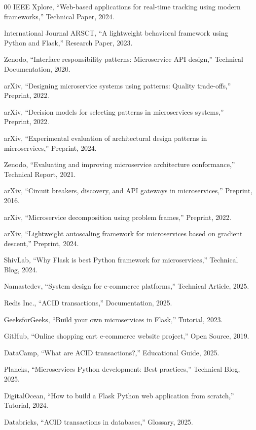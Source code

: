 \documentclass[conference]{IEEEtran}
\begin{document}
\begin{thebibliography}{00}
 IEEE Xplore, ``Web-based applications for real-time tracking using modern frameworks,'' Technical Paper, 2024.

 International Journal ARSCT, ``A lightweight behavioral framework using Python and Flask,'' Research Paper, 2023.

 Zenodo, ``Interface responsibility patterns: Microservice API design,'' Technical Documentation, 2020.

 arXiv, ``Designing microservice systems using patterns: Quality trade-offs,'' Preprint, 2022.

 arXiv, ``Decision models for selecting patterns in microservices systems,'' Preprint, 2022.

 arXiv, ``Experimental evaluation of architectural design patterns in microservices,'' Preprint, 2024.

 Zenodo, ``Evaluating and improving microservice architecture conformance,'' Technical Report, 2021.

 arXiv, ``Circuit breakers, discovery, and API gateways in microservices,'' Preprint, 2016.

 arXiv, ``Microservice decomposition using problem frames,'' Preprint, 2022.

 arXiv, ``Lightweight autoscaling framework for microservices based on gradient descent,'' Preprint, 2024.

 ShivLab, ``Why Flask is best Python framework for microservices,'' Technical Blog, 2024.

 Namastedev, ``System design for e-commerce platforms,'' Technical Article, 2025.

 Redis Inc., ``ACID transactions,'' Documentation, 2025.

 GeeksforGeeks, ``Build your own microservices in Flask,'' Tutorial, 2023.

 GitHub, ``Online shopping cart e-commerce website project,'' Open Source, 2019.

 DataCamp, ``What are ACID transactions?,'' Educational Guide, 2025.

 Planeks, ``Microservices Python development: Best practices,'' Technical Blog, 2025.

 DigitalOcean, ``How to build a Flask Python web application from scratch,'' Tutorial, 2024.

 Databricks, ``ACID transactions in databases,'' Glossary, 2025.

\end{thebibliography}
\end{document}
